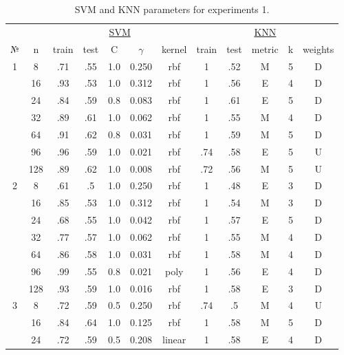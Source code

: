 \begin{table}
\centering
\caption{SVM and KNN parameters for experiments 1.}
\label{tab:params_1_svm_knn}
\begin{tabular}{|c|c|ccccc||ccccc|}\hline
& & \multicolumn{5}{c||}{\underline{SVM}} & \multicolumn{5}{c|}{\underline{KNN}}\\
№ &   n & train & test &   C & $\gamma$ & kernel & train & test & metric & k & weights \\\hline
1 &   8 &   .71 &  .55 & 1.0 &    0.250 &    rbf &     1 &  .52 &      M & 5 &       D \\
  &  16 &   .93 &  .53 & 1.0 &    0.312 &    rbf &     1 &  .56 &      E & 4 &       D \\
  &  24 &   .84 &  .59 & 0.8 &    0.083 &    rbf &     1 &  .61 &      E & 5 &       D \\
  &  32 &   .89 &  .61 & 1.0 &    0.062 &    rbf &     1 &  .55 &      M & 4 &       D \\
  &  64 &   .91 &  .62 & 0.8 &    0.031 &    rbf &     1 &  .59 &      M & 5 &       D \\
  &  96 &   .96 &  .59 & 1.0 &    0.021 &    rbf &   .74 &  .58 &      E & 5 &       U \\
  & 128 &   .89 &  .62 & 1.0 &    0.008 &    rbf &   .72 &  .56 &      M & 5 &       U \\\hline
2 &   8 &   .61 &   .5 & 1.0 &    0.250 &    rbf &     1 &  .48 &      E & 3 &       D \\
  &  16 &   .85 &  .53 & 1.0 &    0.312 &    rbf &     1 &  .54 &      M & 3 &       D \\
  &  24 &   .68 &  .55 & 1.0 &    0.042 &    rbf &     1 &  .57 &      E & 5 &       D \\
  &  32 &   .77 &  .57 & 1.0 &    0.062 &    rbf &     1 &  .55 &      M & 4 &       D \\
  &  64 &   .86 &  .58 & 1.0 &    0.031 &    rbf &     1 &  .58 &      M & 4 &       D \\
  &  96 &   .99 &  .55 & 0.8 &    0.021 &   poly &     1 &  .56 &      E & 4 &       D \\
  & 128 &   .93 &  .59 & 1.0 &    0.016 &    rbf &     1 &  .58 &      E & 3 &       D \\\hline
3 &   8 &   .72 &  .59 & 0.5 &    0.250 &    rbf &   .74 &   .5 &      M & 4 &       U \\
  &  16 &   .84 &  .64 & 1.0 &    0.125 &    rbf &     1 &  .58 &      M & 5 &       D \\
  &  24 &   .72 &  .59 & 0.5 &    0.208 & linear &     1 &  .58 &      E & 4 &       D \\

\end{tabular}
\end{table}
